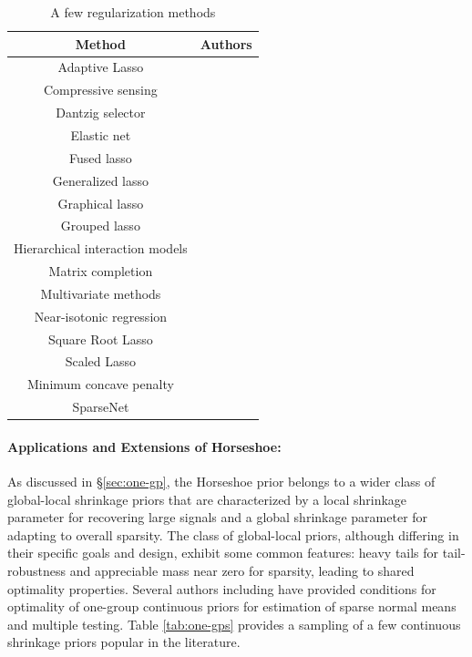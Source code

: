\documentclass[11pt]{article}
\numberwithin{equation}{section}
\begin{document}
\begin{table}[ht!]
  \centering
  \caption{A few regularization methods}
  \footnotesize{
    \begin{tabular}{|c|c|}
    \hline
    Method  & Authors  \bigstrut\\
    \hline
    Adaptive Lasso & \citet{zou2006adaptive} \bigstrut[t]\\
    Compressive sensing  & \citet{donoho2006compressed,candes2008restricted} \\
    Dantzig selector  & \citet{candes2007dantzig} \\
    Elastic net & \citet{zou2005regularization} \\
    Fused lasso & \citet{tibshirani2005sparsity} \\
    Generalized lasso & \citet{tibshirani2011solution} \\
    Graphical lasso & \citet{friedman2008sparse} \\
    Grouped lasso & \citet{yuan2006model} \\
    Hierarchical interaction models & \citet{bien2013lasso} \\
    Matrix completion & \citet{candes2010power,mazumder2010spectral} \\
    Multivariate methods & \citet{jolliffe2003modified,witten2009penalized} \\
    Near-isotonic regression & \citet{tibshirani2011nearly} \\
    Square Root Lasso  & \citet{belloni2011square} \\
    Scaled Lasso & \citet{sun2012scaled} \\
    Minimum concave penalty & \citet{zhang2010nearly} \\
    SparseNet & \citet{mazumder2012} \bigstrut[b]\\
    \hline
    \end{tabular}%
    }
  \label{tab:lasso:ext}%
\end{table}%

\paragraph{Applications and Extensions of Horseshoe:}

As discussed in \S \ref{sec:one-gp}, the Horseshoe prior belongs to a wider class of global-local shrinkage priors \citep{polson2010shrink} that are characterized by a local shrinkage parameter for recovering large signals and a global shrinkage parameter for adapting to overall sparsity. The class of global-local priors, although differing in their specific goals and design, exhibit some common features: heavy tails for tail-robustness and appreciable mass near zero for sparsity, leading to shared optimality properties. Several authors including \citet{van2015conditions, ghosh2016asymptotic, ghosh2016testing} have provided conditions for optimality of one-group continuous priors for estimation of sparse normal means and multiple testing. Table \ref{tab:one-gps} provides a sampling of a few continuous shrinkage priors popular in the literature. 
\end{document}
